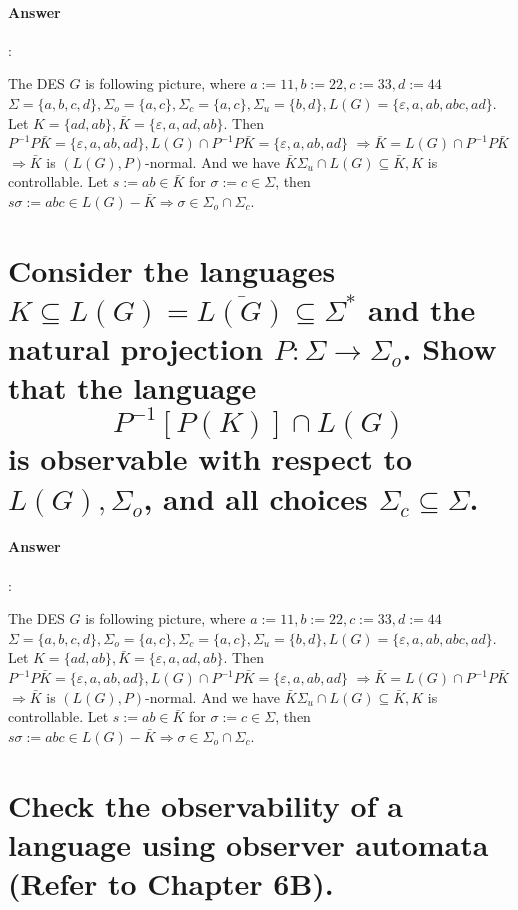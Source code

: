 \documentclass{article}
\begin{document}
\paragraph{Answer}:

The DES $G$ is following picture, where $a:=11, b:=22, c:=33, d:=44$ $\Sigma=\{a, b, c, d\}, \Sigma_o=\{a, c\}, \Sigma_c=\{a, c\}, \Sigma_u=\{b, d\}, L(G)=\{\varepsilon, a, a b, a b c, a d\}$. Let $K=\{a d, a b\}, \bar{K}=\{\varepsilon, a, a d, a b\}$.
Then $P^{-1} P \bar{K}=\{\varepsilon, a, a b, a d\}, L(G) \cap P^{-1} P \bar{K}=\{\varepsilon, a, a b, a d\}$
$\Longrightarrow \bar{K}=L(G) \cap P^{-1} P \bar{K}$
$\Longrightarrow \bar{K}$ is $(L(G), P)$-normal.
And we have $\bar{K} \Sigma_u \cap L(G) \subseteq \bar{K}, K$ is controllable. Let $s:=a b \in \bar{K}$ for $\sigma:=c \in \Sigma$, then $s \sigma:=a b c \in L(G)-\bar{K} \Longrightarrow \sigma \in \Sigma_o \cap \Sigma_c$.

\section{Consider the languages $K \subseteq L(G)=\overline{L(G)} \subseteq \Sigma^*$ and the natural projection $P: \Sigma \rightarrow \Sigma_o$. Show that the language
$$
P^{-1}[P(K)] \cap L(G)
$$
is observable with respect to $L(G), \Sigma_o$, and all choices $\Sigma_c \subseteq \Sigma$.}

\paragraph{Answer}:

The DES $G$ is following picture, where $a:=11, b:=22, c:=33, d:=44$ $\Sigma=\{a, b, c, d\}, \Sigma_o=\{a, c\}, \Sigma_c=\{a, c\}, \Sigma_u=\{b, d\}, L(G)=\{\varepsilon, a, a b, a b c, a d\}$. Let $K=\{a d, a b\}, \bar{K}=\{\varepsilon, a, a d, a b\}$.
Then $P^{-1} P \bar{K}=\{\varepsilon, a, a b, a d\}, L(G) \cap P^{-1} P \bar{K}=\{\varepsilon, a, a b, a d\}$
$\Longrightarrow \bar{K}=L(G) \cap P^{-1} P \bar{K}$
$\Longrightarrow \bar{K}$ is $(L(G), P)$-normal.
And we have $\bar{K} \Sigma_u \cap L(G) \subseteq \bar{K}, K$ is controllable. Let $s:=a b \in \bar{K}$ for $\sigma:=c \in \Sigma$, then $s \sigma:=a b c \in L(G)-\bar{K} \Longrightarrow \sigma \in \Sigma_o \cap \Sigma_c$.

\section{Check the observability of a language using observer automata (Refer to Chapter 6B).}
\end{document}
